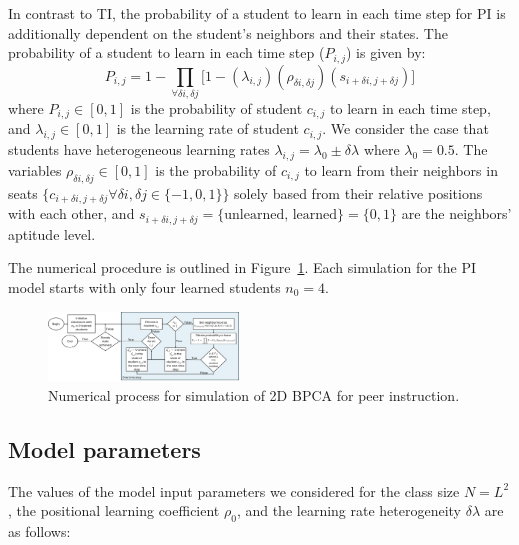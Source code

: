 \documentclass[twocolumn,secnumarabic,amssymb, nobibnotes, aps, prd]{revtex4-2}
\begin{document}
        In contrast to TI, the probability of a student to learn in each time step for PI is additionally dependent on the student's neighbors and their states. The probability of a student to learn in each time step ($P_{i,j}$) is given by:
        \begin{equation}
            \label{eq:BPCA PI learning probability}
                P_{i,j} = 1 - \prod_{\forall \delta i, \delta j}{\lbrack1-(\lambda_{i,j})(\rho_{\delta i, \delta j})(s_{i+\delta i, j+\delta j})}\rbrack
        \end{equation}
        where
        $P_{i,j} \in [0,1]$ is the probability of student $c_{i,j}$ to learn in each time step, and
        $\lambda_{i,j} \in  [0,1]$ is the learning rate of student $c_{i,j}$.
        We consider the case that students have heterogeneous learning rates $\lambda_{i,j}=\lambda_0 \pm \delta\lambda$ where $\lambda_0=0.5$.
        The variables $\rho_{\delta i, \delta j} \in [0,1]$ is the probability of $c_{i,j}$ to learn from their neighbors in seats $\lbrace c_{i+\delta i, j+\delta j} \forall \delta i, \delta j \in \lbrace -1,0,1 \rbrace \rbrace$ solely based from their relative positions with each other, and
        $s_{i+\delta i, j+\delta j} = \lbrace\text{unlearned, learned}\rbrace=\lbrace 0,1 \rbrace$ are the neighbors' aptitude level.

        The numerical procedure is outlined in Figure~\ref{fig:PI flowchart}.
        Each simulation for the PI model starts with only four learned students $n_0 = 4$.
        \begin{figure}[htbp!]
            \centering
            \includegraphics[width=0.45\textwidth]{figures/2DBPCA PI Flowchart.png}
            \caption[Peer instruction simulation flowchart]{Numerical process for simulation of 2D BPCA for peer instruction.}
            \label{fig:PI flowchart}
        \end{figure}


    \subsection{Model parameters}
        The values of the model input parameters we considered for the class size $N=L^2$, the positional learning coefficient $\rho_0$, and the learning rate heterogeneity $\delta\lambda$ are as follows:
\end{document}
